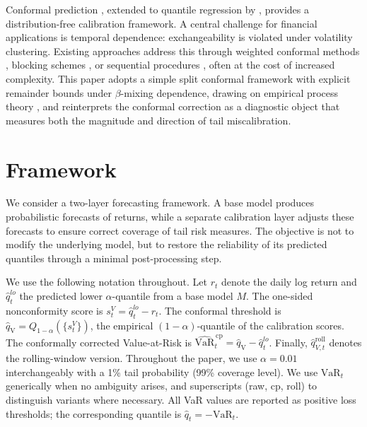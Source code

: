 \documentclass[preprint,11pt,authoryear]{elsarticle}
\newcommand{\VaR}{\mathrm{VaR}}
\newcommand{\1}{\boldsymbol{1}}
\newcommand{\qV}{\hat{q}_{\scriptscriptstyle\mathrm{V}}}
\begin{document}
	Conformal prediction \citep{vovk2005algorithmic}, extended to
	quantile regression by \citet{romano2019conformalized},
	provides a distribution-free calibration framework. A central
	challenge for financial applications is temporal dependence:
	exchangeability is violated under volatility clustering.
	Existing approaches address this through weighted conformal
	methods \citep{barber2023conformal}, blocking schemes
	\citep{chernozhukov2018exact}, or sequential procedures
	\citep{gibbs2021adaptive, zaffran2022conformal,
		xu2024conformal}, often at the cost of increased complexity.
	This paper adopts a simple split conformal framework with
	explicit remainder bounds under $\beta$-mixing dependence,
	drawing on empirical process theory
	\citep{rio2017asymptotic, yu1994rates}, and reinterprets the
	conformal correction as a diagnostic object that measures both
	the magnitude and direction of tail miscalibration.
	
	\section{Framework}
	\label{sec:framework}
	
	We consider a two-layer forecasting framework. A base model
	produces probabilistic forecasts of returns, while a separate
	calibration layer adjusts these forecasts to ensure correct
	coverage of tail risk measures. The objective is not to modify
	the underlying model, but to restore the reliability of its
	predicted quantiles through a minimal post-processing step.
	
	We use the following notation throughout. Let $r_t$ denote the
	daily log return and $\hat{q}_t^{lo}$ the predicted lower
	$\alpha$-quantile from a base model $M$. The one-sided
	nonconformity score is $s_t^{V} = \hat{q}_t^{lo} - r_t$. The
	conformal threshold is
	$\qV = Q_{1-\alpha}(\{s_t^{V}\})$, the empirical
	$(1-\alpha)$-quantile of the calibration scores. The
	conformally corrected Value-at-Risk is
	$\widehat{\VaR}_t^{\,\mathrm{cp}} = \qV - \hat{q}_t^{lo}$.
	Finally, $\hat{q}_{V,t}^{\mathrm{roll}}$ denotes the
	rolling-window version.
	Throughout the paper, we use $\alpha = 0.01$ interchangeably with a 1\% tail probability (99\% coverage level).
	We use $\VaR_t$ generically when no ambiguity arises, and superscripts (raw, cp, roll) to distinguish variants where necessary. All VaR values are reported as positive loss thresholds; the corresponding quantile is $\hat{q}_t = -\VaR_t$.
\end{document}

